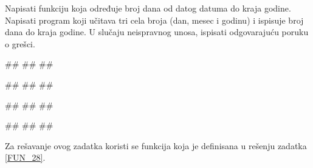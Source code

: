 \begin{Exercise}[label=FUN_27] 
Napisati funkciju  koja određuje broj dana od datog datuma do kraja
godine. Napisati program koji učitava tri cela broja (dan, mesec i godinu) i ispisuje broj
dana do kraja godine. 
U slučaju neispravnog unosa, ispisati odgovarajuću poruku o grešci.

\begin{miditest}
\begin{upotreba}{1}
#\naslovInt#
##
##
\end{upotreba}
\end{miditest}
\begin{miditest}
\begin{upotreba}{2}
#\naslovInt#
##
##
\end{upotreba}
\end{miditest}

\begin{miditest}
\begin{upotreba}{3}
#\naslovInt#
##
##
\end{upotreba}
\end{miditest}
\begin{miditest}
\begin{upotreba}{4}
#\naslovInt#
##
##
\end{upotreba}
\end{miditest}

\end{Exercise}
\ifresenja 
\begin{Answer}[ref=FUN_27]

Za rešavanje ovog zadatka koristi se funkcija  koja je definisana u rešenju zadatka \ref{FUN_28}.
\end{Answer} 
\fi

